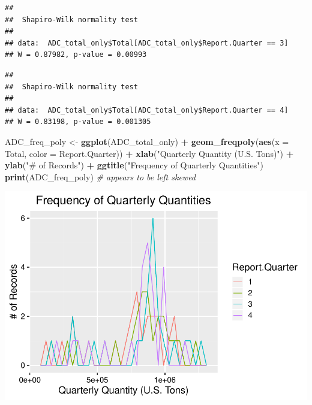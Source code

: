 \documentclass[12pt,]{article}
\newenvironment{Shaded}{\begin{snugshade}}{\end{snugshade}}
\newcommand{\KeywordTok}[1]{\textcolor[rgb]{0.13,0.29,0.53}{\textbf{#1}}}
\newcommand{\DataTypeTok}[1]{\textcolor[rgb]{0.13,0.29,0.53}{#1}}
\newcommand{\DecValTok}[1]{\textcolor[rgb]{0.00,0.00,0.81}{#1}}
\newcommand{\StringTok}[1]{\textcolor[rgb]{0.31,0.60,0.02}{#1}}
\newcommand{\CommentTok}[1]{\textcolor[rgb]{0.56,0.35,0.01}{\textit{#1}}}
\newcommand{\OperatorTok}[1]{\textcolor[rgb]{0.81,0.36,0.00}{\textbf{#1}}}
\newcommand{\NormalTok}[1]{#1}
\begin{document}
\begin{verbatim}
## 
##  Shapiro-Wilk normality test
## 
## data:  ADC_total_only$Total[ADC_total_only$Report.Quarter == 3]
## W = 0.87982, p-value = 0.00993
\end{verbatim}

\begin{Shaded}
\end{Shaded}

\begin{verbatim}
## 
##  Shapiro-Wilk normality test
## 
## data:  ADC_total_only$Total[ADC_total_only$Report.Quarter == 4]
## W = 0.83198, p-value = 0.001305
\end{verbatim}

\begin{Shaded}
\begin{Highlighting}[]
\NormalTok{ADC_freq_poly <-}\StringTok{ }\KeywordTok{ggplot}\NormalTok{(ADC_total_only) }\OperatorTok{+}
\StringTok{  }\KeywordTok{geom_freqpoly}\NormalTok{(}\KeywordTok{aes}\NormalTok{(}\DataTypeTok{x =}\NormalTok{ Total, }\DataTypeTok{color =}\NormalTok{ Report.Quarter)) }\OperatorTok{+}\StringTok{ }
\StringTok{  }\KeywordTok{xlab}\NormalTok{(}\StringTok{"Quarterly Quantity (U.S. Tons)"}\NormalTok{) }\OperatorTok{+}\StringTok{ }
\StringTok{  }\KeywordTok{ylab}\NormalTok{(}\StringTok{"# of Records"}\NormalTok{) }\OperatorTok{+}\StringTok{ }
\StringTok{  }\KeywordTok{ggtitle}\NormalTok{(}\StringTok{"Frequency of Quarterly Quantities"}\NormalTok{)}
\KeywordTok{print}\NormalTok{(ADC_freq_poly) }\CommentTok{# appears to be left skewed}
\end{Highlighting}
\end{Shaded}

\includegraphics{SKo_Project_Template_files/figure-latex/Test1_1-1.pdf}
\end{document}
